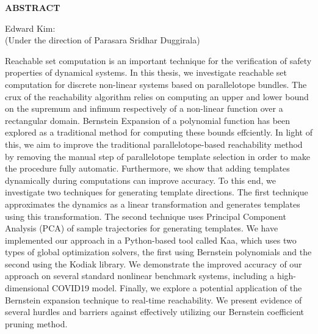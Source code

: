 \begin{center}
\vspace*{52pt}
{\Large \textbf{ABSTRACT}}
\vspace{11pt}

\begin{singlespace}
Edward Kim: \thesistitle \\
(Under the direction of Parasara Sridhar Duggirala)
\end{singlespace}

\end{center}
\par Reachable set computation is an important technique for the verification of safety properties of dynamical systems.
%
%
In this thesis, we investigate reachable set computation for discrete non-linear systems based on parallelotope bundles.
%
The crux of the reachability algorithm relies on computing an upper and lower bound on the supremum and infimum respectively of a non-linear function over a rectangular domain.
%
Bernstein Expansion of a polynomial function has been explored as a traditional method for computing these bounds effciently.
%
In light of this, we aim to improve the traditional parallelotope-based reachability method by removing the manual step of parallelotope template selection in order to make the procedure fully automatic.
%
Furthermore, we show that adding templates dynamically during computations can improve accuracy.
%
To this end, we investigate two techniques for generating template directions.
%
The first technique approximates the dynamics as a linear transformation and generates templates using this transformation.
%
The second technique uses Principal Component Analysis (PCA) of sample trajectories for generating templates.
%
We have implemented our approach in a Python-based tool called Kaa, which uses two types of global optimization solvers, the first using Bernstein polynomials and the second using
the Kodiak library.
%
We demonstrate the improved accuracy of our approach on several standard nonlinear benchmark systems, including a high-dimensional COVID19 model.
%
Finally, we explore a potential application of the Bernstein expansion technique to real-time reachability.
%
We present evidence of several hurdles and barriers against effectively utilizing our Bernstein coefficient pruning method.
\clearpage
